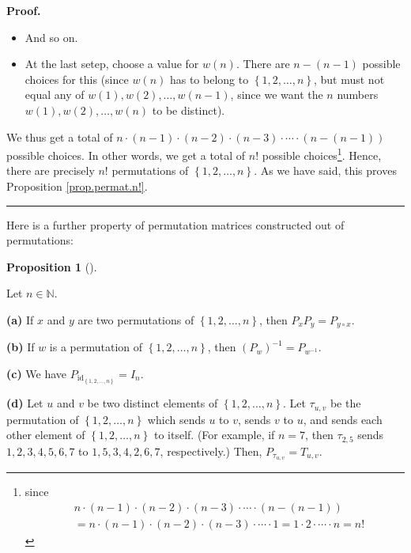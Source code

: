 \documentclass[numbers=enddot,12pt,final,onecolumn,notitlepage]{scrartcl}%
\theoremstyle{definition}
\newtheorem{prop}[theo]{Proposition}
\newenvironment{proposition}[1][]
{\begin{prop}[#1]\begin{leftbar}}
{\end{leftbar}\end{prop}}
\newenvironment{proof}[1][Proof]{\noindent\textbf{#1.} }{\ \rule{0.5em}{0.5em}}
\begin{document}
\begin{proof}
\begin{itemize}
\item And so on.

\item At the last setep, choose a value for $w\left(  n\right)  $. There are
$n-\left(  n-1\right)  $ possible choices for this (since $w\left(  n\right)
$ has to belong to $\left\{  1,2,\ldots,n\right\}  $, but must not equal any
of $w\left(  1\right)  ,w\left(  2\right)  ,\ldots,w\left(  n-1\right)  $,
since we want the $n$ numbers $w\left(  1\right)  ,w\left(  2\right)
,\ldots,w\left(  n\right)  $ to be distinct).
\end{itemize}

We thus get a total of $n\cdot\left(  n-1\right)  \cdot\left(  n-2\right)
\cdot\left(  n-3\right)  \cdot\cdots\cdot\left(  n-\left(  n-1\right)
\right)  $ possible choices. In other words, we get a total of $n!$ possible
choices\footnote{since
\begin{align*}
&  n\cdot\left(  n-1\right)  \cdot\left(  n-2\right)  \cdot\left(  n-3\right)
\cdot\cdots\cdot\left(  n-\left(  n-1\right)  \right) \\
&  =n\cdot\left(  n-1\right)  \cdot\left(  n-2\right)  \cdot\left(
n-3\right)  \cdot\cdots\cdot1=1\cdot2\cdot\cdots\cdot n=n!
\end{align*}
}. Hence, there are precisely $n!$ permutations of $\left\{  1,2,\ldots
,n\right\}  $. As we have said, this proves Proposition \ref{prop.permat.n!}.
\end{proof}

Here is a further property of permutation matrices constructed out of permutations:

\begin{proposition}
\label{prop.permat.prod-of-perms}Let $n\in\mathbb{N}$.

\textbf{(a)} If $x$ and $y$ are two permutations of $\left\{  1,2,\ldots
,n\right\}  $, then $P_{x}P_{y}=P_{y\circ x}$.

\textbf{(b)} If $w$ is a permutation of $\left\{  1,2,\ldots,n\right\}  $,
then $\left(  P_{w}\right)  ^{-1}=P_{w^{-1}}$.

\textbf{(c)} We have $P_{\operatorname*{id}\nolimits_{\left\{  1,2,\ldots
,n\right\}  }}=I_{n}$.

\textbf{(d)} Let $u$ and $v$ be two distinct elements of $\left\{
1,2,\ldots,n\right\}  $. Let $\tau_{u,v}$ be the permutation of $\left\{
1,2,\ldots,n\right\}  $ which sends $u$ to $v$, sends $v$ to $u$, and sends
each other element of $\left\{  1,2,\ldots,n\right\}  $ to itself. (For
example, if $n=7$, then $\tau_{2,5}$ sends $1,2,3,4,5,6,7$ to $1,5,3,4,2,6,7$,
respectively.) Then, $P_{\tau_{u,v}}=T_{u,v}$.
\end{proposition}
\end{document}
